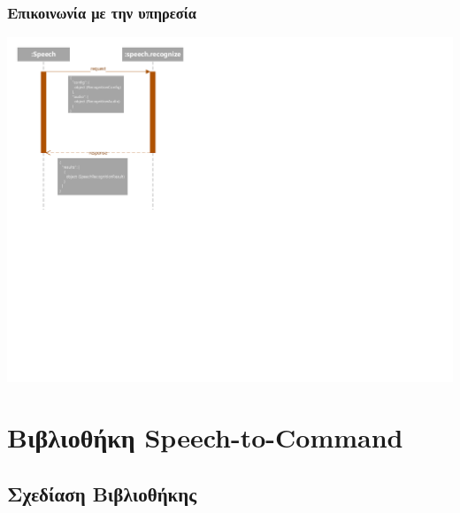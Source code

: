 \documentclass[oneside, 12pt]{book}
\begin{document}
\subsection{Επικοινωνία με την υπηρεσία}
\includegraphics{uml/library_service_sequence_diagram.pdf}
\chapter{Βιβλιοθήκη Speech-to-Command}
\section{Σχεδίαση Βιβλιοθήκης}
\label{ch:σχεδίαση-βιβλιοθήκης}
\end{document}

